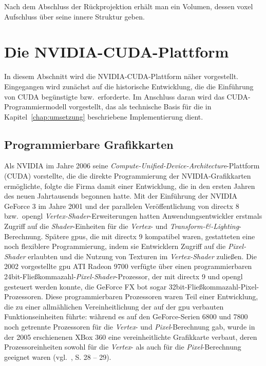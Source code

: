 Nach dem Abschluss der Rückprojektion erhält man ein Volumen, dessen \gls{voxel} Aufschluss über seine innere Struktur
geben.


\section{Die NVIDIA{\textregistered}-CUDA{\textregistered}-Plattform}

In diesem Abschnitt wird die NVIDIA{\textregistered}-CUDA{\textregistered}-Plattform näher vorgestellt. Eingegangen wird
zunächst auf die historische Entwicklung, die die Einführung von CUDA{\textregistered} begünstigte bzw.\ erforderte. Im
Anschluss daran wird das CUDA{\textregistered}-Programmiermodell vorgestellt, das als technische Basis für die in
Kapitel~\ref{chap:umsetzung} beschriebene Implementierung dient.

\subsection{Programmierbare Grafikkarten}\label{ssec:cu_prog_gpu}

Als NVIDIA{\textregistered} im Jahre 2006 seine \textit{Compute-Unified-Device-Architecture}-Plattform
(CUDA{\textregistered}) vorstellte, die die direkte Programmierung der NVIDIA{\textregistered}-Grafikkarten ermöglichte,
folgte die Firma damit einer Entwicklung, die in den ersten Jahren des neuen Jahrtausends begonnen hatte. Mit der
Einführung der NVIDIA{\textregistered} GeForce 3 im Jahre 2001 und der parallelen Veröffentlichung von \gls{directx} 8
bzw.\ \gls{opengl} \textit{Vertex-Shader}-Erweiterungen hatten Anwendungsentwickler erstmals Zugriff auf die
\textit{Shader}-Einheiten für die \textit{Vertex}- und \textit{Transform-\&-Lighting}-Berechnung. Spätere \gls{gpu}s,
die mit \gls{directx} 9 kompatibel waren, gestatteten eine noch flexiblere Programmierung, indem sie Entwicklern Zugriff
auf die \textit{Pixel-Shader} erlaubten und die Nutzung von Texturen im \textit{Vertex-Shader} zuließen. Die 2002
vorgestellte \gls{gpu} ATI Radeon 9700 verfügte über einen programmierbaren
24bit-Fließkommazahl-\textit{Pixel-Shader}-Prozessor, der mit \gls{directx} 9 und \gls{opengl} gesteuert werden
konnte, die GeForce{\textregistered} FX bot sogar 32bit-Fließkommazahl-Pixel-Prozessoren. Diese programmierbaren
Prozessoren waren Teil einer Entwicklung, die zu einer allmählichen Vereinheitlichung der auf der \gls{gpu} verbauten
Funktionseinheiten führte: während es auf den GeForce{\textregistered}-Serien 6800 und 7800 noch getrennte Prozessoren
für die \textit{Vertex}- und \textit{Pixel}-Berechnung gab, wurde in der 2005 erschienenen XBox 360 eine 
{\glqq}vereinheitlichte{\grqq} Grafikkarte verbaut, deren Prozessoreinheiten sowohl für die \textit{Vertex}- als auch
für die \textit{Pixel}-Berechnung geeignet waren (vgl.~\cite{kirkhwu}, S. 28 -- 29).

